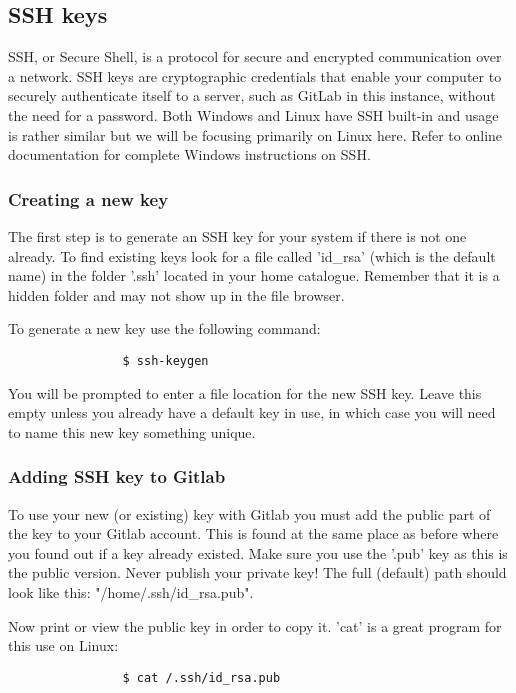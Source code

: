 \documentclass{liu_mall_engelska}
\begin{document}
    \subsection{SSH keys}
        SSH, or Secure Shell, is a protocol for secure and encrypted communication over a network. SSH keys are cryptographic credentials that enable your computer to securely authenticate itself to a server, such as GitLab in this instance, without the need for a password. Both Windows and Linux have SSH built-in and usage is rather similar but we will be focusing primarily on Linux here. Refer to online documentation for complete Windows instructions on SSH.

        \subsubsection{Creating a new key}
            The first step is to generate an SSH key for your system if there is not one already. To find existing keys look for a file called 'id\_rsa' (which is the default name) in the folder '.ssh' located in your home catalogue. Remember that it is a hidden folder and may not show up in the file browser.
            
            To generate a new key use the following command:
            \begin{lstlisting}
                $ ssh-keygen
            \end{lstlisting}
            You will be prompted to enter a file location for the new SSH key. Leave this empty unless you already have a default key in use, in which case you will need to name this new key something unique.

        \subsubsection{Adding SSH key to Gitlab}
            To use your new (or existing) key with Gitlab you must add the public part of the key to your Gitlab account. This is found at the same place as before where you found out if a key already existed. Make sure you use the '.pub' key as this is the public version. Never publish your private key! The full (default) path should look like this: "/home/.ssh/id\_rsa.pub".

            Now print or view the public key in order to copy it. 'cat' is a great program for this use on Linux:
            \begin{lstlisting}
                $ cat /.ssh/id_rsa.pub
            \end{lstlisting}
\end{document}
